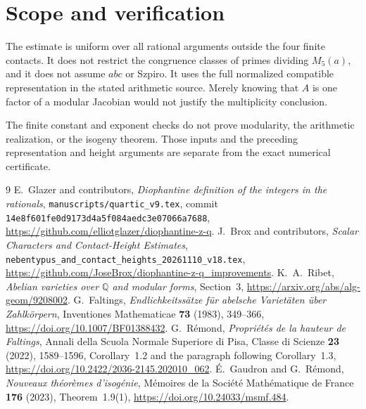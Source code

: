 \documentclass[11pt,a4paper]{article}
\newcommand{\Q}{\mathbb Q}
\begin{document}
\section{Scope and verification}

The estimate is uniform over all rational arguments outside the four
finite contacts. It does not restrict the congruence classes of primes
dividing \(M_5(a)\), and it does not assume \(abc\) or Szpiro.
It uses the full normalized compatible representation in the stated
arithmetic source. Merely knowing that \(A\) is one factor of a modular
Jacobian would not justify the multiplicity conclusion.

The finite constant and exponent checks do not prove modularity,
the arithmetic realization, or the isogeny theorem. Those inputs and
the preceding representation and height arguments are separate from
the exact numerical certificate.

\begin{thebibliography}{9}\small
{}
E.~Glazer and contributors, \emph{Diophantine definition of the integers
in the rationals}, \texttt{manuscripts/quartic\_v9.tex}, commit
\texttt{14e8f601fe0d9173d4a5f084aedc3e07066a7688},
\url{https://github.com/elliotglazer/diophantine-z-q}.
J.~Brox and contributors, \emph{Scalar Characters and Contact-Height
Estimates}, \texttt{nebentypus\_and\_contact\_heights\_20261110\_v18.tex},
\url{https://github.com/JoseBrox/diophantine-z-q_improvements}.
K.~A.~Ribet, \emph{Abelian varieties over $\Q$ and modular forms},
Section~3, \url{https://arxiv.org/abs/alg-geom/9208002}.
G.~Faltings, \emph{Endlichkeitss\"atze f\"ur abelsche Variet\"aten
\"uber Zahlk\"orpern}, Inventiones Mathematicae \textbf{73} (1983),
349--366, \url{https://doi.org/10.1007/BF01388432}.
G.~R\'emond, \emph{Propri\'et\'es de la hauteur de Faltings},
Annali della Scuola Normale Superiore di Pisa, Classe di Scienze
\textbf{23} (2022), 1589--1596, Corollary~1.2 and the paragraph
following Corollary~1.3,
\url{https://doi.org/10.2422/2036-2145.202010_062}.
\'E.~Gaudron and G.~R\'emond, \emph{Nouveaux th\'eor\`emes d'isog\'enie},
M\'emoires de la Soci\'et\'e Math\'ematique de France
\textbf{176} (2023), Theorem~1.9(1),
\url{https://doi.org/10.24033/msmf.484}.
\end{thebibliography}
\end{document}
